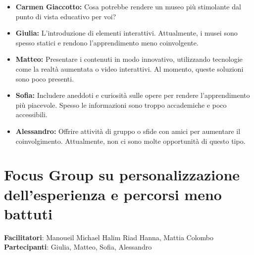 \documentclass{article}
\begin{document}
\begin{itemize}
 \item \textbf{Carmen Giaccotto:} Cosa potrebbe rendere un museo più stimolante dal punto di vista educativo per voi?
 
 \item \textbf{Giulia:} L’introduzione di elementi interattivi. Attualmente, i musei sono spesso statici e rendono l’apprendimento meno coinvolgente.
 
 \item \textbf{Matteo:} Presentare i contenuti in modo innovativo, utilizzando tecnologie come la realtà aumentata o video interattivi. Al momento, queste soluzioni sono poco presenti.
 
 \item \textbf{Sofia:} Includere aneddoti e curiosità sulle opere per rendere l’apprendimento più piacevole. Spesso le informazioni sono troppo accademiche e poco accessibili.
 
 \item \textbf{Alessandro:} Offrire attività di gruppo o sfide con amici per aumentare il coinvolgimento. Attualmente, non ci sono molte opportunità di questo tipo.

\end{itemize}

\section{Focus Group su personalizzazione dell’esperienza e percorsi meno battuti}
\textbf{Facilitatori}: Manoueil Michael Halim Riad Hanna, Mattia Colombo \\
\textbf{Partecipanti}: Giulia, Matteo, Sofia, Alessandro
\end{document}
